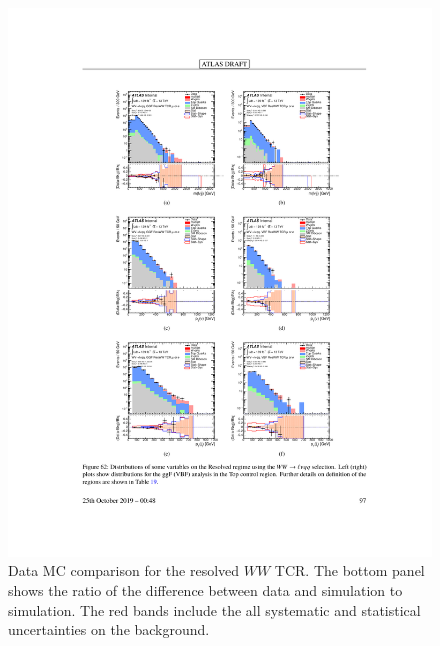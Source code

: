 \begin{figure}[htbp]
  \centering
  \includegraphics{figures/Analysis/datamc/resolved_ww_tcr.pdf}
      \caption{Data MC comparison for the resolved $WW$ TCR. The bottom panel shows the ratio of the difference between data and simulation to simulation. The red bands include the all systematic and statistical uncertainties on the background. } 
  \label{fig:resolved_ww_TCR_datamc}
\end{figure} 
\FloatBarrier


